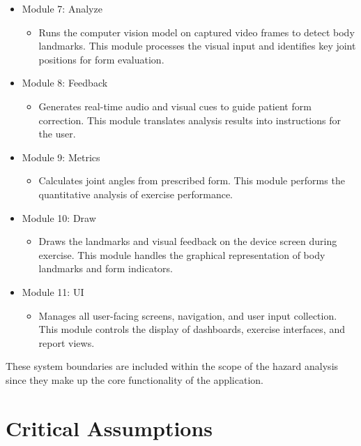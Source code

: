 \documentclass{article}
\begin{document}
\begin{itemize}
    \begin{itemize}
        \item Controls the end-to-end pipeline from video capture through body detection to form analysis.
    \end{itemize}
    \item Module 7: Analyze
    \begin{itemize}
        \item Runs the computer vision model on captured video frames to detect body landmarks. This module processes the visual input and identifies key joint positions for form evaluation.
    \end{itemize}
    \item Module 8: Feedback
    \begin{itemize}
        \item Generates real-time audio and visual cues to guide patient form correction. This module translates analysis results into instructions for the user.
    \end{itemize}
    \item Module 9: Metrics
    \begin{itemize}
        \item Calculates joint angles from prescribed form. This module performs the quantitative analysis of exercise performance.
    \end{itemize}
    \item Module 10: Draw
    \begin{itemize}
        \item Draws the landmarks and visual feedback on the device screen during exercise. This module handles the graphical representation of body landmarks and form indicators.
    \end{itemize}
    \item Module 11: UI
    \begin{itemize}
        \item Manages all user-facing screens, navigation, and user input collection. This module controls the display of dashboards, exercise interfaces, and report views.
    \end{itemize}
\end{itemize}

These system boundaries are included within the scope of the hazard analysis since they make up the core functionality of the application.


\section{Critical Assumptions}
\end{document}
